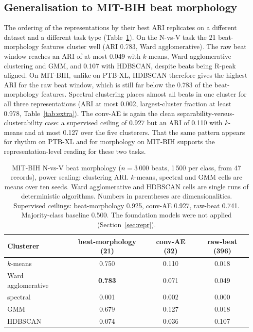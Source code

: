 \documentclass[preprint,11pt]{elsarticle}
\begin{document}
\subsection{Generalisation to MIT-BIH beat morphology}

The ordering of the representations by their best ARI replicates on a different dataset
and a different task type (Table~\ref{tab:mitbih}). On the N-vs-V task the 21
beat-morphology features cluster well (ARI 0.783, Ward agglomerative). The raw beat window
reaches an ARI of at most 0.049 with $k$-means, Ward agglomerative clustering and GMM, and
0.107 with HDBSCAN, despite beats being R-peak aligned. On MIT-BIH, unlike on PTB-XL,
HDBSCAN therefore gives the highest ARI for the raw beat window, which is still far below
the 0.783 of the beat-morphology features. Spectral clustering places almost all beats in
one cluster for all three representations (ARI at most 0.002, largest-cluster fraction at
least 0.978, Table~\ref{tab:extra}). The conv-AE is again the clean
separability-versus-clusterability case: a supervised ceiling of 0.927 but an ARI of
0.110 with $k$-means and at most 0.127 over the five clusterers. That the same pattern appears for rhythm on
PTB-XL and for morphology on MIT-BIH supports the representation-level reading for these
two tasks.

\begin{table}[t]
\centering
\footnotesize
\caption{MIT-BIH N-vs-V beat morphology ($n = 3\,000$ beats, 1\,500 per class, from 47
records), power scaling: clustering ARI. $k$-means, spectral and GMM cells are means over
ten seeds. Ward agglomerative and HDBSCAN cells are single runs of deterministic
algorithms. Numbers in parentheses are dimensionalities. Supervised ceilings: beat-morphology 0.925, conv-AE
0.927, raw-beat 0.741. Majority-class baseline 0.500. The foundation models were not
applied (Section~\ref{sec:repr}).}
\label{tab:mitbih}
\begin{tabular}{lccc}
\toprule
Clusterer & beat-morphology (21) & conv-AE (32) & raw-beat (396) \\
\midrule
$k$-means     & 0.750 & 0.110 & 0.018 \\
Ward agglomerative & \textbf{0.783} & 0.071 & 0.049 \\
spectral      & 0.001 & 0.002 & 0.000 \\
GMM           & 0.679 & 0.127 & 0.018 \\
HDBSCAN       & 0.074 & 0.036 & 0.107 \\
\bottomrule
\end{tabular}
\end{table}
\end{document}
